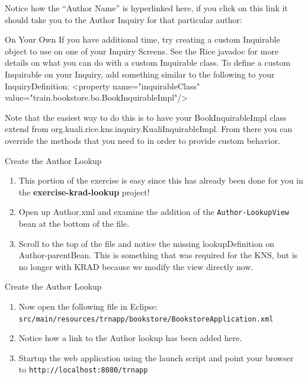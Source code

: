 \documentclass[xcolor=dvipsnames,14pt,professionalfonts]{beamer}
\begin{document}
Notice how the “Author Name” is hyperlinked here, if you click on this link it should take you to the Author Inquiry for that particular author:

\begin{frame}[fragile]{On Your Own}
If you have additional time, try creating a custom Inquirable object to use on one of your Inquiry Screens.  See the Rice javadoc for more details on what you can do with a custom Inquirable class.
To define a custom Inquirable on your Inquiry, add something similar to the following to your InquiryDefinition:
<property name="inquirableClass" 
          value="train.bookstore.bo.BookInquirableImpl"/>

Note that the easiest way to do this is to have your
BookInquirableImpl class extend from
org.kuali.rice.kns.inquiry.KualiInquirableImpl.  From there you can
override the methods that you need to in order to provide custom
behavior.
\end{frame}

\begin{frame}{Create the Author Lookup}
  \begin{enumerate}
    \item This portion of the exercise is easy since this has already been done for you in the \textbf{exercise-krad-lookup} project!
    \item Open up Author.xml and examine the addition of the \texttt{Author-LookupView} bean at the bottom of the file.
    \item Scroll to the top of the file and notice the missing
      lookupDefinition on Author-parentBean. This is something that
      was required for the KNS, but is no longer with KRAD because we
      modify the view directly now.
    \end{enumerate}
  \end{frame}

\begin{frame}{Create the Author Lookup}
  \begin{enumerate}
  \item Now open the following file in Eclipse: 
    \texttt{src/main/resources/trnapp/bookstore/BookstoreApplication.xml}
  \item Notice how a link to the Author lookup has been added here.
  \item Startup the web application using the launch script and point
    your browser to \texttt{http://localhost:8080/trnapp}
    \end{enumerate}
  \end{frame}
\end{document}
